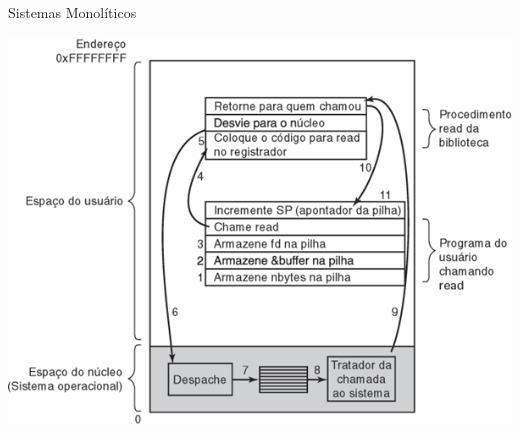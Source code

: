 \documentclass{beamer}
\begin{document}
\begin{frame}{Sistemas Monolíticos}

    \vspace{1cm}
    \begin{center}
        \includegraphics[width=0.5\linewidth]{assets/aula-tads-sope/SO-monolitico-3.png} %
    \end{center}
\end{frame}
\end{document}
